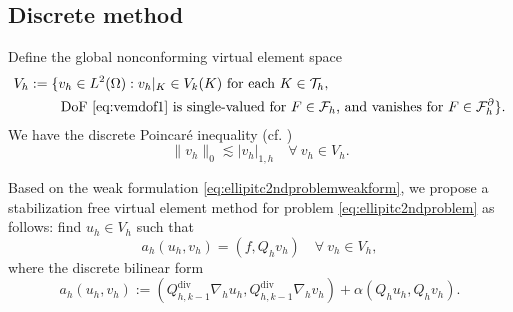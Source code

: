 \documentclass[10pt]{amsart}
\renewcommand{\div}{\operatorname{div}}
\numberwithin{equation}{section}
\begin{document}
\subsection{Discrete method}
Define the global nonconforming virtual element space
\begin{align*}
V_h&:=\{v_h\in L^2(\Omega): v_h|_K\in V_k(K) \textrm{ for each } K\in\mathcal T_h, \textrm{  } \\
&\qquad\; \textrm{DoF \eqref{eq:vemdof1} is single-valued for $F\in\mathcal F_h$, and vanishes for $F\in \mathcal F_h^{\partial}$}\}.
\end{align*}
We have the discrete Poincar\'e inequality (cf. \cite[(4.16)]{ChenHuang2020ncvem})
\begin{equation}\label{eq:vempoincareineqlty}
\|v_h\|_0\lesssim |v_h|_{1,h} \quad\forall~v_h\in V_h.
\end{equation}

Based on the weak formulation \eqref{eq:ellipitc2ndproblemweakform}, we propose a stabilization free virtual element method for problem \eqref{eq:ellipitc2ndproblem} as follows: find $u_h\in V_h$ such that
\begin{equation}\label{eq:vem}
a_h(u_h, v_h)=(f, Q_hv_h)\quad\forall~v_h\in V_h,
\end{equation}
where the discrete bilinear form 
$$
a_h(u_h, v_h):=(Q_{h,k-1}^{\div}\nabla_h u_h, Q_{h,k-1}^{\div}\nabla_h v_h)+\alpha(Q_hu_h, Q_hv_h).
$$
\end{document}
